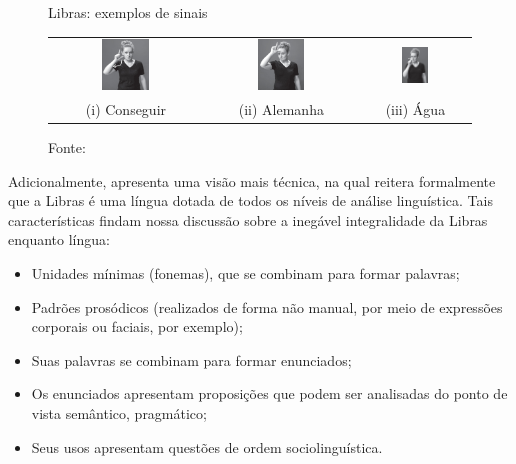 \begin{figure}[htbp]
\centering
\caption{Libras: exemplos de sinais}
\label{fig:libras-palavras}
\begin{tabular}{ccc} \includegraphics[width=0.331\textwidth]{images/libras-sinal-conseguir.png} &
\includegraphics[width=0.325\textwidth]{images/libras-sinal-alemanha.png} & \includegraphics[width=0.264\textwidth]{images/libras-sinal-agua.png} \\
(i) Conseguir & (ii) Alemanha & (iii) Água \\
\end{tabular}
\caption*{Fonte: }
\end{figure}

Adicionalmente,  apresenta uma visão mais técnica, na qual reitera formalmente que a Libras é uma língua dotada de todos os níveis de análise linguística. Tais características findam nossa discussão sobre a inegável integralidade da Libras enquanto língua:
\begin{itemize}
    \item Unidades mínimas (fonemas), que se combinam para formar palavras;
    \item Padrões prosódicos (realizados de forma não manual, por meio de expressões corporais ou faciais, por exemplo);
    \item Suas palavras se combinam para formar enunciados;
    \item Os enunciados apresentam proposições que podem ser analisadas do ponto de vista semântico, pragmático;
    \item Seus usos apresentam questões de ordem sociolinguística.
\end{itemize}

